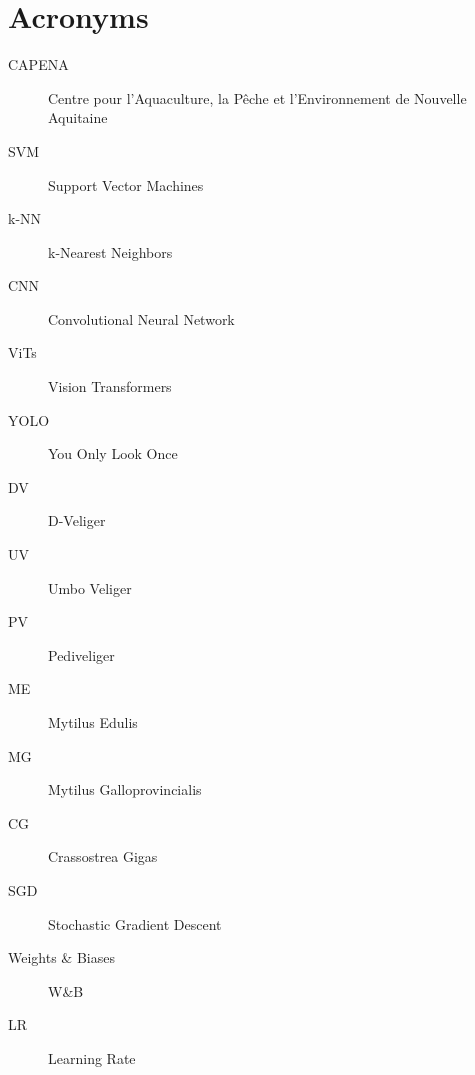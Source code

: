 \chapter*{Acronyms}

\begin{description}
    \item[CAPENA] \hfill Centre pour l’Aquaculture, la Pêche et l’Environnement de Nouvelle Aquitaine
    \item[SVM] \hfill Support Vector Machines
    \item[k-NN] \hfill k-Nearest Neighbors
    \item[CNN] \hfill Convolutional Neural Network
    \item[ViTs] \hfill Vision Transformers
    \item[YOLO] \hfill You Only Look Once
    \item[DV] \hfill D-Veliger
    \item[UV] \hfill Umbo Veliger
    \item[PV] \hfill Pediveliger
    \item[ME] \hfill Mytilus Edulis
    \item[MG] \hfill Mytilus Galloprovincialis
    \item[CG] \hfill Crassostrea Gigas
    \item[SGD] \hfill Stochastic Gradient Descent
    \item[Weights \& Biases] \hfill W\&B
    \item[LR] \hfill Learning Rate
\end{description}
